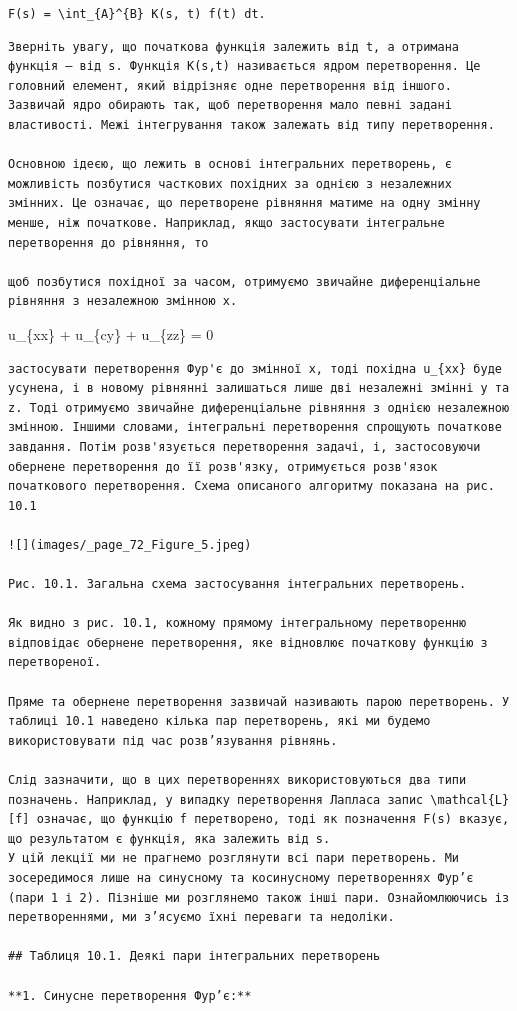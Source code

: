 \documentclass[
  ukrainian,
]{article}
\begin{document}
\texttt{F(s)\ =\ \textbackslash{}int\_\{A\}\^{}\{B\}\ K(s,\ t)\ f(t)\ dt.}

\begin{verbatim}
Зверніть увагу, що початкова функція залежить від t, а отримана функція — від s. Функція K(s,t) називається ядром перетворення. Це головний елемент, який відрізняє одне перетворення від іншого. Зазвичай ядро обирають так, щоб перетворення мало певні задані властивості. Межі інтегрування також залежать від типу перетворення.

Основною ідеєю, що лежить в основі інтегральних перетворень, є можливість позбутися часткових похідних за однією з незалежних змінних. Це означає, що перетворене рівняння матиме на одну змінну менше, ніж початкове. Наприклад, якщо застосувати інтегральне перетворення до рівняння, то

щоб позбутися похідної за часом, отримуємо звичайне диференціальне рівняння з незалежною змінною x.
\end{verbatim}

u\_\{xx\} + u\_\{cy\} + u\_\{zz\} = 0

\begin{verbatim}
застосувати перетворення Фур'є до змінної x, тоді похідна u_{xx} буде усунена, і в новому рівнянні залишаться лише дві незалежні змінні y та z. Тоді отримуємо звичайне диференціальне рівняння з однією незалежною змінною. Іншими словами, інтегральні перетворення спрощують початкове завдання. Потім розв'язується перетворення задачі, і, застосовуючи обернене перетворення до її розв'язку, отримується розв'язок початкового перетворення. Схема описаного алгоритму показана на рис. 10.1

![](images/_page_72_Figure_5.jpeg)

Рис. 10.1. Загальна схема застосування інтегральних перетворень.  

Як видно з рис. 10.1, кожному прямому інтегральному перетворенню відповідає обернене перетворення, яке відновлює початкову функцію з перетвореної.  

Пряме та обернене перетворення зазвичай називають парою перетворень. У таблиці 10.1 наведено кілька пар перетворень, які ми будемо використовувати під час розв’язування рівнянь.  

Слід зазначити, що в цих перетвореннях використовуються два типи позначень. Наприклад, у випадку перетворення Лапласа запис \mathcal{L}[f] означає, що функцію f перетворено, тоді як позначення F(s) вказує, що результатом є функція, яка залежить від s.
У цій лекції ми не прагнемо розглянути всі пари перетворень. Ми зосередимося лише на синусному та косинусному перетвореннях Фур’є (пари 1 і 2). Пізніше ми розглянемо також інші пари. Ознайомлюючись із перетвореннями, ми з’ясуємо їхні переваги та недоліки.  

## Таблиця 10.1. Деякі пари інтегральних перетворень

**1. Синусне перетворення Фур’є:**
\end{verbatim}
\end{document}
